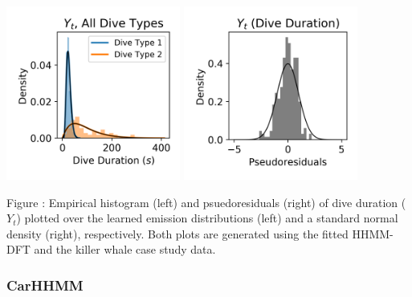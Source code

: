 \documentclass{article}
\begin{document}
        \begin{center}
        \includegraphics[width=2.25in]{../Plots/HHMM_empirical_hist_dive_duration.png}
        \includegraphics[width=2.25in]{../Plots/HHMM_psedoresids_Dive_Duration.png}
        \end{center}
        
        \noindent Figure : Empirical histogram (left) and psuedoresiduals (right) of dive duration ($Y_{t}$) plotted over the learned emission distributions (left) and a standard normal density (right), respectively. Both plots are generated using the fitted HHMM-DFT and the killer whale case study data.
        \addtocounter{fignum}{1}
        
        \subsubsection{CarHHMM}
        
\end{document}
